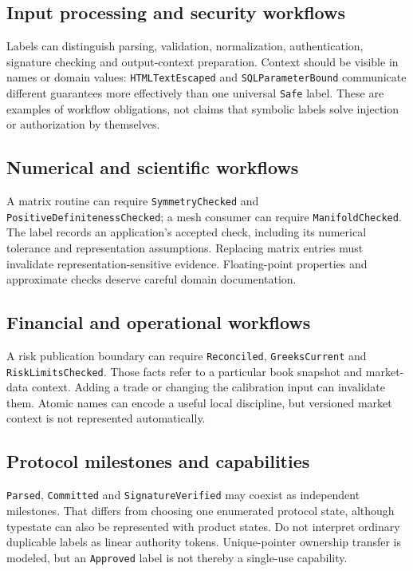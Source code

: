 \documentclass[11pt]{article}
\begin{document}
\subsection{Input processing and security workflows}
Labels can distinguish parsing, validation, normalization, authentication,
signature checking and output-context preparation. Context should be visible
in names or domain values: \texttt{HTMLTextEscaped} and \texttt{SQLParameterBound}
communicate different guarantees more effectively than one universal
\texttt{Safe} label. These are examples of workflow obligations, not claims
that symbolic labels solve injection or authorization by themselves.

\subsection{Numerical and scientific workflows}
A matrix routine can require \texttt{SymmetryChecked} and
\texttt{PositiveDefinitenessChecked}; a mesh consumer can require
\texttt{ManifoldChecked}. The label records an application's accepted check,
including its numerical tolerance and representation assumptions. Replacing
matrix entries must invalidate representation-sensitive evidence. Floating-point
properties and approximate checks deserve careful domain documentation.

\subsection{Financial and operational workflows}
A risk publication boundary can require \texttt{Reconciled},
\texttt{GreeksCurrent} and \texttt{RiskLimitsChecked}. Those facts refer to
a particular book snapshot and market-data context. Adding a trade or changing
the calibration input can invalidate them. Atomic names can encode a useful
local discipline, but versioned market context is not represented automatically.

\subsection{Protocol milestones and capabilities}
\texttt{Parsed}, \texttt{Committed} and \texttt{SignatureVerified} may coexist
as independent milestones. That differs from choosing one enumerated protocol
state, although typestate can also be represented with product states.
Do not interpret ordinary duplicable labels as linear authority tokens.
Unique-pointer ownership transfer is modeled, but an \texttt{Approved} label
is not thereby a single-use capability.
\end{document}
